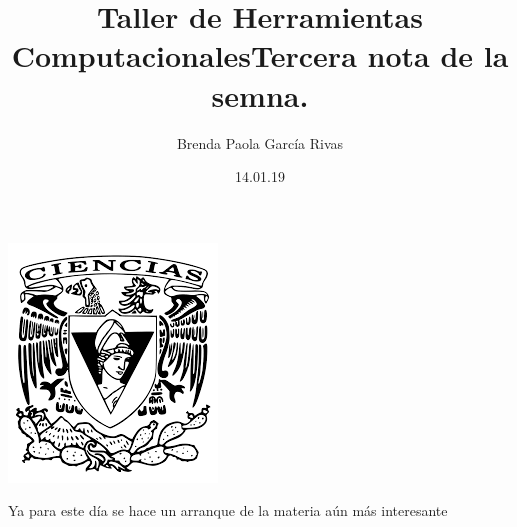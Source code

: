 \documentclass[letterpaper, 12pt, oneside]{article}
\title{\Huge\color{green} Taller de Herramientas Computacionales}
\author{Brenda Paola García Rivas}
\date{14.01.19}
\begin{document}
	\maketitle
	\begin{center}
		\includegraphics[scale=0.95]{1.png}
	\end{center}
	\newpage
	\title{Tercera nota de la semna.\\}
	Ya para este día se hace un arranque de la materia aún más interesante
	
\end{document}

